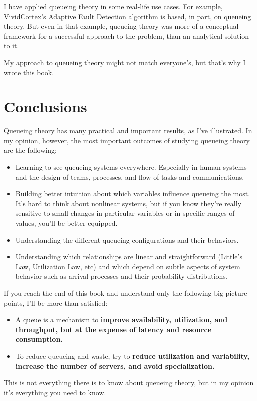 \documentclass{vivid_layout}
\begin{document}
I have applied queueing theory in some real-life use cases. For example, \href{https://www.vividcortex.com/blog/2013/04/17/how-does-adaptive-fault-detection-work-does-it-really-eliminate-thresholds/}{VividCortex's Adaptive Fault Detection algorithm} is based, in part, on queueing theory. But even in that example, queueing theory was more of a conceptual framework for a successful approach to the problem, than an analytical solution to it.

My approach to queueing theory might not match everyone's, but that's why I wrote this book.

\section{Conclusions}
Queueing theory has many practical and important results, as I've
illustrated. In my opinion, however, the most important outcomes of
studying queueing theory are the following:
\begin{itemize}
\item Learning to see queueing systems everywhere. Especially in human systems and the design of teams, processes, and flow of tasks and communications.
\item Building better intuition about which variables influence queueing the most. It's hard to think about nonlinear systems, but if you know they're really sensitive to small changes in particular variables or in specific ranges of values, you'll be better equipped.
\item Understanding the different queueing configurations and their behaviors.
\item Understanding which relationships are linear and straightforward (Little's Law, Utilization Law, etc) and which depend on subtle aspects of system behavior such as arrival processes and their probability distributions.
\end{itemize}
If you reach the end of this book and understand only the following big-picture points, I'll be more than satisfied:
\begin{itemize}
\item A queue is a mechanism to {\bfseries improve availability, utilization,
and throughput, but at the expense of latency and resource consumption.}
\item To reduce queueing and waste, try to {\bfseries reduce utilization and variability, increase the number of servers, and avoid specialization.}
\end{itemize}
This is not everything there is to know about queueing theory, but in my opinion it's everything you need to know.
\end{document}
